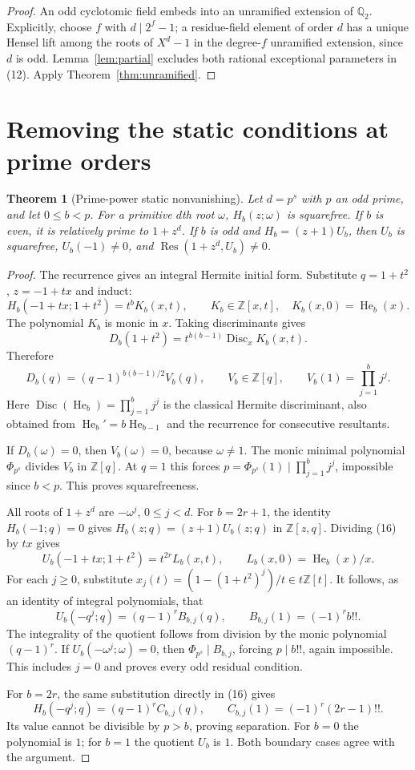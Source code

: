\documentclass[11pt]{article}
\newtheorem{theorem}{Theorem}
\theoremstyle{remark}\newtheorem{remark}[theorem]{Remark}
\newcommand{\He}{\operatorname{He}}
\newcommand{\Disc}{\operatorname{Disc}}
\newcommand{\Res}{\operatorname{Res}}
\newcommand{\Q}{\mathbb{Q}}
\newcommand{\Z}{\mathbb{Z}}
\begin{document}
\begin{proof}
An odd cyclotomic field embeds into an unramified extension of
$\Q_2$. Explicitly, choose $f$ with $d\mid2^f-1$; a residue-field
element of order $d$ has a unique Hensel lift among the roots of
$X^d-1$ in the degree-$f$ unramified extension, since $d$ is odd.
Lemma~\ref{lem:partial} excludes both rational exceptional parameters
in (12). Apply Theorem~\ref{thm:unramified}.
\end{proof}

\section{Removing the static conditions at prime orders}

\begin{theorem}[Prime-power static nonvanishing]\label{thm:static}
Let $d=p^s$ with $p$ an odd prime, and let $0\leq b<p$.
For a primitive $d$th root $\omega$, $H_b(z;\omega)$ is squarefree.
If $b$ is even, it is relatively prime to $1+z^d$.
If $b$ is odd and $H_b=(z+1)U_b$, then $U_b$ is squarefree,
$U_b(-1)\ne0$, and $\Res(1+z^d,U_b)\ne0$.
\end{theorem}

\begin{proof}
The recurrence gives an integral Hermite initial form. Substitute
$q=1+t^2$, $z=-1+tx$ and induct:
\[
H_b(-1+tx;1+t^2)=t^b K_b(x,t),\qquad
K_b\in\Z[x,t],\quad K_b(x,0)=\He_b(x).
\tag{16}
\]
The polynomial $K_b$ is monic in $x$. Taking discriminants gives
\[
D_b(1+t^2)=t^{b(b-1)}\Disc_x K_b(x,t).
\]
Therefore
\[
D_b(q)=(q-1)^{b(b-1)/2}V_b(q),\qquad
V_b\in\Z[q],\qquad V_b(1)=\prod_{j=1}^b j^j.
\tag{17}
\]
Here $\Disc(\He_b)=\prod_{j=1}^b j^j$ is the classical Hermite
discriminant, also obtained from $\He_b'=b\He_{b-1}$ and the
recurrence for consecutive resultants.

If $D_b(\omega)=0$, then $V_b(\omega)=0$, because $\omega\ne1$.
The monic minimal polynomial $\Phi_{p^s}$ divides $V_b$ in
$\Z[q]$. At $q=1$ this forces
$p=\Phi_{p^s}(1)\mid\prod_{j=1}^b j^j$, impossible since $b<p$.
This proves squarefreeness.

All roots of $1+z^d$ are $-\omega^j$, $0\leq j<d$.
For $b=2r+1$, the identity $H_b(-1;q)=0$ gives
$H_b(z;q)=(z+1)U_b(z;q)$ in $\Z[z,q]$.
Dividing (16) by $tx$ gives
\[
U_b(-1+tx;1+t^2)=t^{2r}L_b(x,t),\qquad
L_b(x,0)=\He_b(x)/x.
\]
For each $j\geq0$, substitute
$x_j(t)=(1-(1+t^2)^j)/t\in t\Z[t]$.
It follows, as an identity of integral polynomials, that
\[
U_b(-q^j;q)=(q-1)^rB_{b,j}(q),\qquad
B_{b,j}(1)=(-1)^r b!!.
\tag{18}
\]
The integrality of the quotient follows from division by the monic
polynomial $(q-1)^r$. If $U_b(-\omega^j;\omega)=0$, then
$\Phi_{p^s}\mid B_{b,j}$, forcing $p\mid b!!$, again impossible.
This includes $j=0$ and proves every odd residual condition.

For $b=2r$, the same substitution directly in (16) gives
\[
H_b(-q^j;q)=(q-1)^rC_{b,j}(q),\qquad
C_{b,j}(1)=(-1)^r(2r-1)!!.
\tag{19}
\]
Its value cannot be divisible by $p>b$, proving separation.
For $b=0$ the polynomial is $1$; for $b=1$ the quotient $U_b$ is
$1$. Both boundary cases agree with the argument.
\end{proof}
\end{document}
